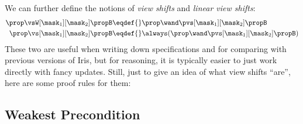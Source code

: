 We can further define the notions of \emph{view shifts} and \emph{linear view shifts}:
\begin{align*}
  \prop \vsW[\mask_1][\mask_2] \propB \eqdef{}& \prop \wand \pvs[\mask_1][\mask_2] \propB \\
  \prop \vs[\mask_1][\mask_2] \propB \eqdef{}& \always(\prop \wand \pvs[\mask_1][\mask_2] \propB)
\end{align*}
These two are useful when writing down specifications and for comparing with previous versions of Iris, but for reasoning, it is typically easier to just work directly with fancy updates.
Still, just to give an idea of what view shifts ``are'', here are some proof rules for them:

\subsection{Weakest Precondition}

